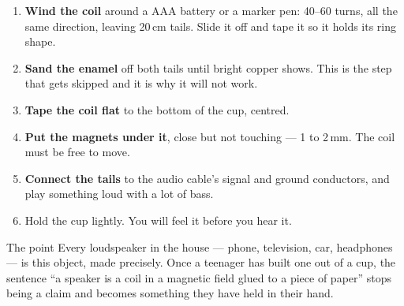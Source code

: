 \begin{enumerate}
\item \textbf{Wind the coil} around a AAA battery or a marker pen: 40--60 turns, all the same direction, leaving 20\,cm tails. Slide it off and tape it so it holds its ring shape.
\item \textbf{Sand the enamel} off both tails until bright copper shows. This is the step that gets skipped and it is why it will not work.
\item \textbf{Tape the coil flat} to the bottom of the cup, centred.
\item \textbf{Put the magnets under it}, close but not touching --- 1 to 2\,mm. The coil must be free to move.
\item \textbf{Connect the tails} to the audio cable's signal and ground conductors, and play something loud with a lot of bass.
\item Hold the cup lightly. You will feel it before you hear it.
\end{enumerate}

\begin{telosfacts}[0.22]
\end{telosfacts}

\begin{telospanel}{The point}
Every loudspeaker in the house --- phone, television, car, headphones --- is this
object, made precisely. Once a teenager has built one out of a cup, the sentence
``a speaker is a coil in a magnetic field glued to a piece of paper'' stops
being a claim and becomes something they have held in their hand.
\end{telospanel}
\lowvoltagenote

